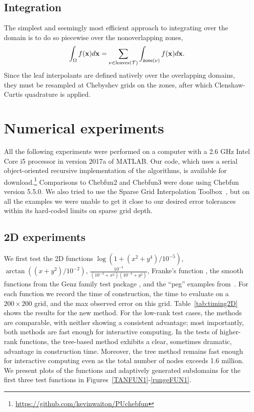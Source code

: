 \subsection{Integration}

The simplest and seemingly most efficient approach to integrating over the domain is to do so piecewise over the nonoverlapping zones,
\begin{equation}
  \label{eq:integration}
  \int_{\Omega} f(\mathbf{x}) d\mathbf{x} = \sum_{\nu\in \text{leaves}(\mathcal{T})} \int_{\text{\textsf{zone}($\nu$)}} f(\mathbf{x}) d\mathbf{x}.
\end{equation}
Since the leaf interpolants are defined natively over the overlapping domains, they must be resampled at Chebyshev grids on the zones, after which Clenshaw-Curtis quadrature is applied.

\section{Numerical experiments}
\label{sec:numerical_experiments}

All the following experiments were performed on a computer with a 2.6 GHz Intel Core i5 processor in version 2017a of MATLAB. Our code, which uses a serial object-oriented recursive implementation of the algorithms, is available for download.\footnote{\url{https://github.com/kevinwaiton/PUchebfun}} Comparisons to Chebfun2 and Chebfun3 were done using Chebfun version 5.5.0. We also tried to use the Sparse Grid Interpolation Toolbox~\cite{Klimke2005}, but on all the examples we were unable to get it close to our desired error tolerances within its hard-coded limits on sparse grid depth. 

\subsection{2D experiments}

We first test the 2D functions $\log(1+(x^2+y^4)/10^{-5})$, $\arctan((x+y^2)/10^{-2})$, $\frac{10^{-4}}{(10^{-4}+x^2)(10^{-4}+y^2)}$, Franke's function \cite{franke1979critical}, the smooth functions from the Genz family test package \cite{genz1987package}, and the ``peg'' examples from~\cite{trefethen2017cubature}. For each function we record the time of construction, the time to evaluate on a $200\times 200$ grid, and the max observed error on this grid. Table~\ref{tab:timing2D} shows the results for the new method. For the low-rank test cases, the methods are comparable, with neither showing a consistent advantage; most importantly, both methods are fast enough for interactive computing. In the tests of higher-rank functions, the tree-based method exhibits a clear, sometimes dramatic, advantage in construction time. Moreover, the tree method remains fast enough for interactive computing even as the total number of nodes exceeds 1.6 million.  We present plots of the functions and adaptively generated subdomains for the first three test functions in Figures~\ref{TANFUN1}-\ref{rungeFUN1}.

